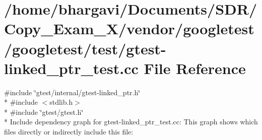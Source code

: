 \hypertarget{gtest-linked__ptr__test_8cc}{}\section{/home/bhargavi/\+Documents/\+S\+D\+R/\+Copy\+\_\+\+Exam\+\_\+X/vendor/googletest/googletest/test/gtest-\/linked\+\_\+ptr\+\_\+test.cc File Reference}
\label{gtest-linked__ptr__test_8cc}
{\ttfamily \#include \char`\"{}gtest/internal/gtest-\/linked\+\_\+ptr.\+h\char`\"{}}\\*
{\ttfamily \#include $<$stdlib.\+h$>$}\\*
{\ttfamily \#include \char`\"{}gtest/gtest.\+h\char`\"{}}\\*
Include dependency graph for gtest-\/linked\+\_\+ptr\+\_\+test.cc\+:
This graph shows which files directly or indirectly include this file\+:

